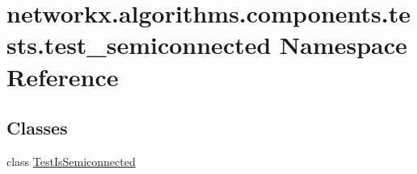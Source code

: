 \hypertarget{namespacenetworkx_1_1algorithms_1_1components_1_1tests_1_1test__semiconnected}{}\section{networkx.\+algorithms.\+components.\+tests.\+test\+\_\+semiconnected Namespace Reference}
\label{namespacenetworkx_1_1algorithms_1_1components_1_1tests_1_1test__semiconnected}
\subsection*{Classes}
\begin{DoxyCompactItemize}
\item 
class \hyperlink{classnetworkx_1_1algorithms_1_1components_1_1tests_1_1test__semiconnected_1_1TestIsSemiconnected}{Test\+Is\+Semiconnected}
\end{DoxyCompactItemize}
